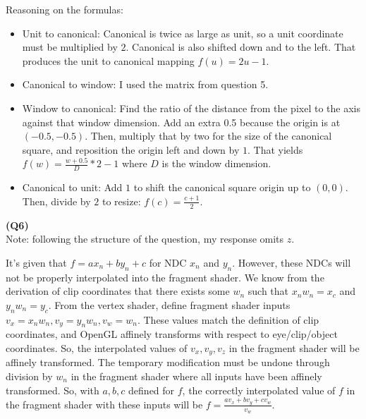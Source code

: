 \documentclass[letterpaper, 11pt]{article}
\begin{document}
\medskip
Reasoning on the formulas:
\begin{itemize}
  \item Unit to canonical: Canonical is twice as large as unit, so a unit coordinate must be multiplied by $2$. Canonical is also shifted down and to the left. That produces the unit to canonical mapping $f(u) = 2u - 1$.
  \item Canonical to window: I used the matrix from question 5.
  \item Window to canonical: Find the ratio of the distance from the pixel to the axis against that window dimension. Add an extra 0.5 because the origin is at $(-0.5, -0.5)$. Then, multiply that by two for the size of the canonical square, and reposition the origin left and down by $1$. That yields $f(w) = \frac{w + 0.5}{D} * 2 - 1$ where $D$ is the window dimension. 
  \item Canonical to unit: Add $1$ to shift the canonical square origin up to $(0, 0)$. Then, divide by $2$ to resize: $f(c) = \frac{c + 1}{2}$.
\end{itemize}

\medskip
\textbf{(Q6)} \\ 
Note: following the structure of the question, my response omits $z$. 

\medskip
It's given that $f = ax_n + by_n + c$ for NDC $x_n$ and $y_n$. However, these NDCs will not be properly interpolated into the fragment shader. We know from the derivation of clip coordinates that there exists some $w_n$ such that $x_nw_n = x_c$ and $y_nw_n = y_c$. From the vertex shader, define fragment shader inputs $v_x = x_nw_n, v_y = y_nw_n, v_w = w_n$. These values match the definition of clip coordinates, and OpenGL affinely transforms with respect to eye/clip/object coordinates. So, the interpolated values of $v_x, v_y, v_z$ in the fragment shader will be affinely transformed. The temporary modification must be undone through division by $w_n$ in the fragment shader where all inputs have been affinely transformed. So, with $a, b, c$ defined for $f$, the correctly interpolated value of $f$ in the fragment shader with these inputs will be $f = \frac{av_x + bv_y + cv_w}{v_w}$.
\end{document}
